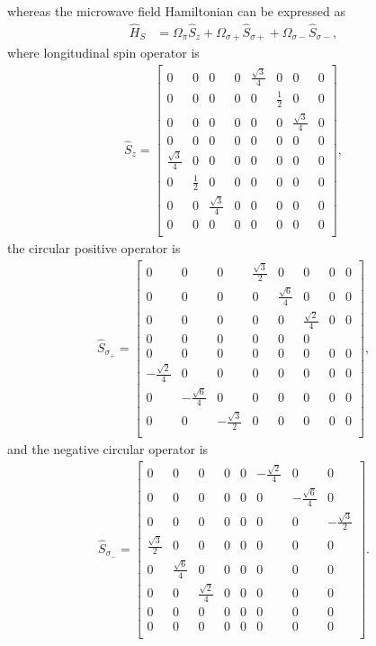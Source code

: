 \documentclass[%
reprint,
 amsmath,amssymb,
 aps,
floatfix,
]{revtex4-1}
\begin{document}
whereas the microwave field Hamiltonian can be expressed as
\begin{align}
\hat{H}_{S}&=\Omega_\pi \hat{S}_z +\Omega_{\sigma+} \hat{S}_{\sigma+}+\Omega_{\sigma-} \hat{S}_{\sigma-},
\end{align}
where longitudinal spin operator is
\begin{align}
\hat{S}_{z}=\begin{bmatrix}
    0 & 0 & 0 &0 & \frac{\sqrt{3}}{4} & 0 &0 & 0  \\
    0 & 0 & 0 &0 & 0 & \frac{1}{2} &0 & 0 \\
    0 & 0 & 0 &0 & 0 & 0 &\frac{\sqrt{3}}{4} & 0 \\
    0 & 0 & 0 &0&0 & 0 & 0 &0\\
    \frac{\sqrt{3}}{4} & 0 & 0 &0&0 & 0 & 0 &0\\
    0 &  \frac{1}{2} & 0 &0&0 & 0 & 0 &0\\
    0 & 0 & \frac{\sqrt{3}}{4} &0&0 & 0 & 0 &0\\
    0 & 0 & 0 &0&0 & 0 & 0 &0\\
\end{bmatrix},\label{eq:Sz}
\end{align}
the circular positive operator is 
\begin{align}
\hat{S}_{\sigma_+}=\begin{bmatrix}
    0 & 0 & 0 & \frac{\sqrt{3}}{2} & 0 &0 &0& 0  \\
    0 & 0 & 0 & 0 & \frac{\sqrt{6}}{4} &0 &0& 0 \\
    0 & 0 & 0 & 0 & 0 & \frac{\sqrt{2}}{4} &0&0 \\
    0 & 0 & 0 & 0 & 0 &0\\
    0 & 0 & 0 &0&0 & 0 & 0 &0\\
    -\frac{\sqrt{2}}{4} & 0 & 0 &0&0 & 0 & 0 &0\\
    0 & - \frac{\sqrt{6}}{4} & 0 &0&0 & 0 & 0 &0\\
    0 & 0 & -\frac{\sqrt{3}}{2} &0&0 & 0 & 0 &0\\
\end{bmatrix},\label{eq:Sp}
\end{align}
and the negative circular operator is
\begin{align}
\hat{S}_{\sigma_-}=\begin{bmatrix}
    0 & 0 & 0 &0 & 0&-\frac{\sqrt{2}}{4} & 0 &0   \\
    0 & 0 & 0 &0 & 0& 0 & -\frac{\sqrt{6}}{4} &0 \\
    0 & 0 & 0 &0 & 0& 0 & 0 &-\frac{\sqrt{3}}{2} \\
    \frac{\sqrt{3}}{2} & 0 & 0 &0&0 & 0 & 0 &0\\
    0 &  \frac{\sqrt{6}}{4} & 0 &0&0 & 0 & 0 &0\\
    0 & 0 & \frac{\sqrt{2}}{4} &0&0 & 0 & 0 &0\\
    0 & 0 & 0 &0&0 & 0 & 0 &0\\
    0 & 0 & 0 &0&0 & 0 & 0 &0\\
\end{bmatrix}.\label{eq:Sn}
\end{align}
\end{document}
